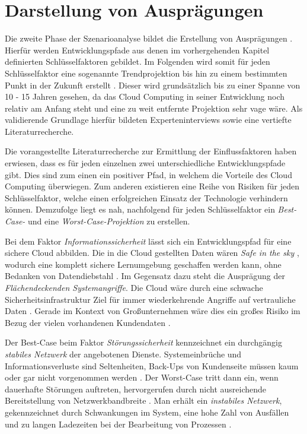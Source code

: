\section{Darstellung von Ausprägungen}
\label{manifestations}

Die zweite Phase der Szenarioanalyse bildet die Erstellung von Ausprägungen \cite{spath}. Hierfür werden Entwicklungspfade aus denen im vorhergehenden Kapitel definierten Schlüsselfaktoren gebildet. Im Folgenden wird somit für jeden Schlüsselfaktor eine sogenannte Trendprojektion bis hin zu einem bestimmten Punkt in der Zukunft erstellt \cite{mietzner}. Dieser wird grundsätzlich bis zu einer Spanne von 10 - 15 Jahren gesehen, da das Cloud Computing in seiner Entwicklung noch relativ am Anfang steht und eine zu weit entfernte Projektion sehr vage wäre. Als validierende Grundlage hierfür bildeten Experteninterviews sowie eine vertiefte Literaturrecherche.

Die vorangestellte Literaturrecherche zur Ermittlung der Einflussfaktoren haben erwiesen, dass es für jeden einzelnen zwei unterschiedliche Entwicklungspfade gibt. Dies sind zum einen ein positiver Pfad, in welchem die Vorteile des Cloud Computing überwiegen. Zum anderen existieren eine Reihe von Risiken für jeden Schlüsselfaktor, welche einen erfolgreichen Einsatz der Technologie verhindern können. Demzufolge liegt es nah, nachfolgend für jeden Schlüsselfaktor ein \textit{Best-Case-} und eine \textit{Worst-Case-Projektion} zu erstellen.

Bei dem Faktor \textit{Informationssicherheit} lässt sich ein Entwicklungspfad für eine sichere Cloud abbilden. Die in die Cloud gestellten Daten wären \textit{Safe in the sky }\cite{almajalid}, wodurch eine komplett sichere Lernumgebung geschaffen werden kann, ohne Bedanken von Datendiebstahl \cite{meinel} \cite{renz}. Im Gegensatz dazu steht die Ausprägung der \textit{Flächendeckenden Systemangriffe}. Die Cloud wäre durch eine schwache Sicherheitsinfrastruktur Ziel für immer wiederkehrende Angriffe auf vertrauliche Daten \cite{gebauer}. Gerade im Kontext von Großunternehmen wäre dies ein großes Risiko im Bezug der vielen vorhandenen Kundendaten \cite{stute}.

Der Best-Case beim Faktor \textit{Störungssicherheit} kennzeichnet ein durchgängig \textit{stabiles Netzwerk} der angebotenen Dienste. Systemeinbrüche und Informationsverluste sind Seltenheiten, Back-Ups von Kundenseite müssen kaum oder gar nicht vorgenommen werden \cite{almajalid}. Der Worst-Case tritt dann ein, wenn dauerhafte Störungen auftreten, hervorgerufen durch nicht ausreichende Bereitstellung von Netzwerkbandbreite \cite{gebauer}. Man erhält ein \textit{instabiles Netzwerk}, gekennzeichnet durch Schwankungen im System, eine hohe Zahl von Ausfällen und zu langen Ladezeiten bei der Bearbeitung von Prozessen \cite{gebauer}.

